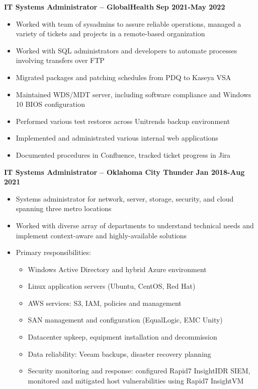 \documentclass[line]{res}
\begin{document}
\begin{resume}
\textbf{IT Systems Administrator -- GlobalHealth}
\newline
\textbf{Sep 2021-May 2022}
\begin{itemize}
	\item Worked with team of sysadmins to assure reliable operations, managed a variety of tickets and projects in a remote-based organization
	\item Worked with SQL administrators and developers to automate processes involving transfers over FTP
	\item Migrated packages and patching schedules from PDQ to Kaseya VSA
	\item Maintained WDS/MDT server, including software compliance and Windows 10 BIOS configuration
	\item Performed various test restores across Unitrends backup environment
	\item Implemented and administrated various internal web applications
	\item Documented procedures in Confluence, tracked ticket progress in Jira 
\end{itemize}
\textbf{IT Systems Administrator -- Oklahoma City Thunder}
\newline
\textbf{Jan 2018-Aug 2021}
\begin{itemize}
	\item Systems administrator for network, server, storage, security, and cloud spanning three metro locations
	\item Worked with diverse array of departments to understand technical needs and implement context-aware and highly-available solutions
	\item Primary responsibilities:
		\begin{itemize}
			\item Windows Active Directory and hybrid Azure environment
			\item Linux application servers (Ubuntu, CentOS, Red Hat)
			\item AWS services: S3, IAM, policies and management
			\item SAN management and configuration (EqualLogic, EMC Unity)
			\item Datacenter upkeep, equipment installation and decommission
			\item Data reliability: Veeam backups, disaster recovery planning
			\item Security monitoring and response: configured Rapid7 InsightIDR SIEM, monitored and mitigated host vulnerabilities using Rapid7 InsightVM

\end{itemize}
\end{itemize}
\end{resume}
\end{document}

